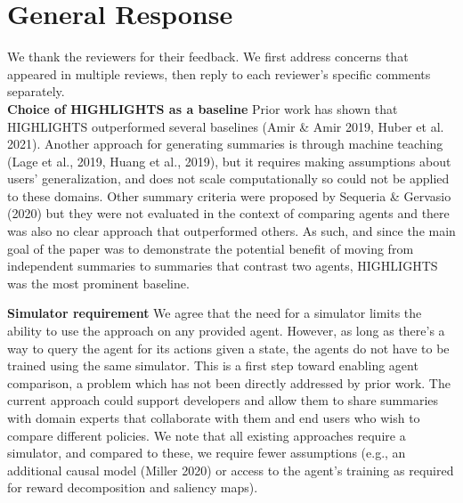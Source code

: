 
\clearpage

\section{General Response}
We thank the reviewers for their feedback. We first address concerns that appeared in multiple reviews, then reply to each reviewer's specific comments separately.
\\
\textbf{Choice of HIGHLIGHTS as a baseline}
Prior work has shown that HIGHLIGHTS outperformed several baselines (Amir \& Amir 2019, Huber et al. 2021). Another approach for generating summaries is through machine teaching (Lage et al., 2019, Huang et al., 2019), but it requires making assumptions about  users’ generalization, and does not scale computationally so could not be applied to these domains. Other summary criteria were proposed by Sequeria \& Gervasio (2020) but they were not evaluated in the context of comparing agents and there was also no clear approach that outperformed others. As such, and since the main goal of the paper was to demonstrate the potential benefit of moving from independent summaries to summaries that contrast two agents, HIGHLIGHTS was the most prominent baseline.

\textbf{Simulator requirement}
We agree that the need for a simulator limits the ability to use the approach on any provided agent. However, as long as there's a way to query the agent for its actions given a state, the agents do not have to be trained using the same simulator. This is a first step toward enabling agent comparison, a problem which has not been directly addressed by prior work. The current approach could support developers and allow them to share summaries with domain experts that collaborate with them and end users who wish to compare different policies. We note that all existing approaches require a simulator, and compared to these, we require fewer assumptions (e.g., an additional causal model (Miller 2020) or access to the agent's training as required for reward decomposition and saliency maps). 


